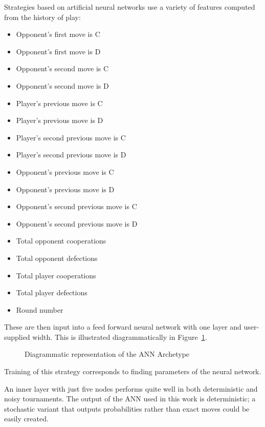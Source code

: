 \documentclass{article}
\begin{document}
Strategies based on artificial neural networks use a variety of features
computed from the history of play:

\begin{multicols}{2}
    \begin{itemize}
        \item Opponent's first move is C
        \item Opponent's first move is D
        \item Opponent's second move is C
        \item Opponent's second move is D
        \item Player's previous move is C
        \item Player's previous move is D
        \item Player's second previous move is C
        \item Player's second previous move is D
        \item Opponent's previous move is C
        \item Opponent's previous move is D
        \item Opponent's second previous move is C
        \item Opponent's second previous move is D
        \item Total opponent cooperations
        \item Total opponent defections
        \item Total player cooperations
        \item Total player defections
        \item Round number
    \end{itemize}
\end{multicols}

These are then input into a feed forward neural network with one layer and
user-supplied width.  This is illustrated diagrammatically in
Figure~\ref{fig:ann}.

\begin{figure}[!hbtp]
    \centering
    
    \caption{Diagrammatic representation of the ANN Archetype}
    \label{fig:ann}
\end{figure}

Training of this strategy corresponds to finding parameters of the neural
network.

An inner layer with just five nodes performs quite well in both deterministic and
noisy tournaments. The output of the ANN used in this work is deterministic;
a stochastic variant that outputs probabilities rather than exact moves could
be easily created.
\end{document}
